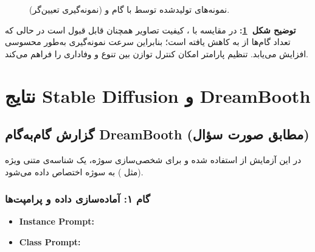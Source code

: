 \begin{figure}[H]
    \centering
    \caption{نمونه‌های تولیدشده توسط  با  گام و  (نمونه‌گیری تعیین‌گر).}
    \label{fig:ddim-samples}
\end{figure}

\noindent\textbf{توضیح شکل~\ref{fig:ddim-samples}:}
در مقایسه با ، کیفیت تصاویر همچنان قابل قبول است در حالی که تعداد گام‌ها از  به  کاهش یافته است؛ بنابراین سرعت نمونه‌گیری به‌طور محسوسی افزایش می‌یابد. تنظیم پارامتر \lr{$\eta$} امکان کنترل توازن بین تنوع و وفاداری را فراهم می‌کند.

\section{نتایج Stable Diffusion و DreamBooth}

\subsection{گزارش گام‌به‌گام DreamBooth (مطابق صورت سؤال)}
در این آزمایش از  استفاده شده و برای شخصی‌سازی سوژه، یک شناسه‌ی متنی ویژه (مثل ) به سوژه اختصاص داده می‌شود.

\subsubsection*{گام ۱: آماده‌سازی داده و پرامپت‌ها}
\begin{itemize}
    \item \textbf{Instance Prompt:} 
    \item \textbf{Class Prompt:} 
\end{itemize}

